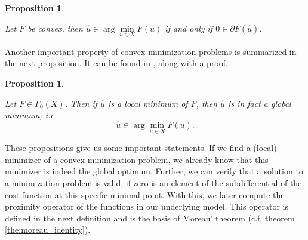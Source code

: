 \documentclass{scrreprt}
\newtheorem{proposition}[theorem]{Proposition}
\begin{document}

        \begin{proposition} %
        \label{prop:zero_element_of_subgradient}
            
            Let $F$ be convex, then $\hat{u} \in \arg \min\limits_{u \in X} F(u)$ if and only if $0 \in \partial F(\hat{u})$.

        \end{proposition}

        Another important property of convex minimization problems is summarized in the next proposition. It can be found in \cite{Rockafellar}, along with a proof.

        \begin{proposition} %
        \label{prop:global_minimum}

            Let $F \in \Gamma_{0}(X)$. Then if $\hat{u}$ is a local minimum of $F$, then $\hat{u}$ is in fact a global minimum, i.e.
                    $$
                        \hat{u} \in \arg \min_{u \in X} F(u).
                    $$
        \end{proposition}

        These propositions give us some important statements. If we find a (local) minimizer of a convex minimization problem, we already know that this minimizer is indeed the global optimum. Further, we can verify that a solution to a minimization problem is valid, if zero is an element of the subdifferential of the cost function at this specific minimal point. With this, we later compute the proximity operator of the functions in our underlying model. This operator is defined in the next definition and is the basis of Moreau' theorem (c.f. theorem \ref{the:moreau_identity}).
\end{document}
